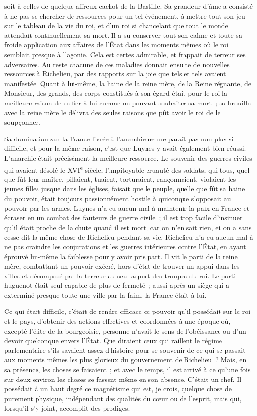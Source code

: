 \documentclass[french,twoside]{book} %
\begin{document}
soit à celles de quelque affreux cachot de la Bastille. Sa grandeur d'âme a consisté à ne pas se chercher de ressources pour un tel événement, à mettre tout son jeu sur le tableau de la vie du roi, et d'un roi si chancelant que tout le monde attendait continuellement sa mort. Il a su conserver tout son calme et toute sa froide application aux affaires de l'État dans les moments mêmes où le roi semblait presque à l'agonie. Cela est certes admirable, et frappait de terreur ses adver­saires. Au reste chacune de ces maladies donnait ensuite de nouvelles ressour­ces à Richelieu, par des rapports sur la joie que tels et tels avaient manifestée. Quant à lui-même, la haine de la reine mère, de la Reine régnante, de Mon­sieur, des grands, des corps constitués à son égard était pour le roi la meilleure raison de se fier à lui comme ne pouvant souhaiter sa mort ; sa brouille avec la reine mère le délivra des seules raisons que pût avoir le roi de le soupçonner.\par
Sa domination sur la France livrée à l'anarchie ne me paraît pas non plus si difficile, et pour la même raison, c'est que Luynes y avait également bien réussi. L'anarchie était précisément la meilleure ressource. Le souvenir des guerres civiles qui avaient désolé le XVI\textsuperscript{e} siècle, l'impitoyable cruauté des soldats, qui tous, quel que fût leur maître, pillaient, tuaient, torturaient, ran­çonnaient, violaient les jeunes filles jusque dans les églises, faisait que le peuple, quelle que fût sa haine du pouvoir, était toujours passionnément hostile à quiconque s'opposait au pouvoir par les armes. Luynes n'a eu aucun mal à maintenir la paix en France et écraser en un combat des fauteurs de guerre civile ; il est trop facile d'insinuer qu'il était proche de la chute quand il est mort, car on n'en sait rien, et on a sans cesse dit la même chose de Richelieu pendant sa vie. Richelieu n'a eu aucun mal à ne pas craindre les conjurations et les guerres intérieures contre l'État, en ayant éprouvé lui-même la faiblesse pour y avoir pris part. Il vit le parti de la reine mère, combattant un pouvoir exécré, hors d'état de trouver un appui dans les villes et décomposé par la terreur au seul aspect des troupes du roi. Le parti huguenot était seul capable de plus de fermeté ; aussi après un siège qui a exterminé presque toute une ville par la faim, la France était à lui.\par
Ce qui était difficile, c'était de rendre efficace ce pouvoir qu'il possédait sur le roi et le pays, d'obtenir des actions effectives et coordonnées à une époque où, excepté l'élite de la bourgeoisie, personne n'avait le sens de l'obéis­sance ou d'un devoir quelconque envers l'État. Que diraient ceux qui raillent le régime parlementaire s'ils savaient assez d'histoire pour se souvenir de ce qui se passait aux moments mêmes les plus glorieux du gouvernement de Richelieu ? Mais, en sa présence, les choses se faisaient ; et avec le temps, il est arrivé à ce qu'une fois sur deux environ les choses se fassent même en son absence. C'était un chef. Il possédait à un haut degré ce magnétisme qui est, je crois, quelque chose de purement physique, indépendant des qualités du cœur ou de l'esprit, mais qui, lorsqu'il s'y joint, accomplit des prodiges.\par
\end{document}
